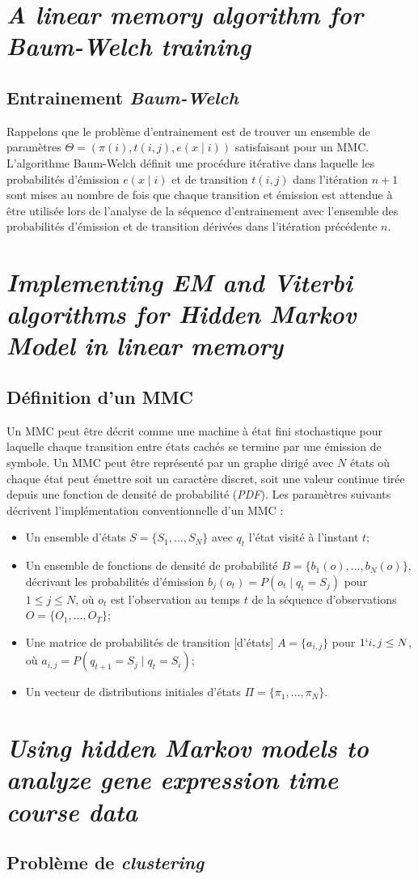 \documentclass[a4paper, 11pt]{article}
\newcommand{\pinit}{\pi (i)}
\newcommand{\ptrans}{t(i,j)}
\newcommand{\pemi}{e(x\mid i)}
\begin{document}
\section{\textit{A linear memory algorithm for Baum-Welch training}}
\subsection{Entrainement \textit{Baum-Welch}}
Rappelons que le problème d'entrainement est de trouver un ensemble de paramètres $\Theta = (\pinit,\ptrans,\pemi)$ satisfaisant pour un MMC.
L'algorithme Baum-Welch définit une procédure itérative dans laquelle les probabilités d'émission $\pemi$ et de transition $\ptrans$ dans l'itération $n+1$ sont mises au nombre de fois que chaque transition et émission est attendue à être utilisée lors de l'analyse de la séquence d'entrainement avec l'ensemble des probabilités d'émission et de transition dérivées dans l'itération précédente $n$.

\section{\textit{Implementing EM and Viterbi algorithms for Hidden Markov Model in linear memory}}
\subsection{Définition d'un MMC}
Un MMC peut être décrit comme une machine à état fini stochastique pour laquelle chaque transition entre états cachés se termine par une émission de symbole. Un MMC peut être représenté par un graphe dirigé avec $N$ états où chaque état peut émettre soit un caractère discret, soit une valeur continue tirée depuis une fonction de densité de probabilité (\textit{PDF}). Les paramètres suivants décrivent l'implémentation conventionnelle d'un MMC :
\begin{itemize}
	\item Un ensemble d'états $S=\{S_1,\dotsc ,S_N\}$ avec $q_t$ l'état visité à l'instant $t$;
	\item Un ensemble de fonctions de densité de probabilité $B = \{b_1(o),\dotsc ,b_N(o)\}$, décrivant les probabilités d'émission $b_j(o_t) = P(o_t \mid q_t = S_j)$ pour $1\leq j\leq N$, où $o_t$ est l'observation au temps $t$ de la séquence d'observations $O=\{O_1,\dotsc ,O_T\}$;
	\item Une matrice de probabilités de transition [d'états] $A = \{a_{i, j}\}$ pour $1\lq i, j \leq N$, où $a_{i, j}=P(q_{t+1} = S_j \mid q_t = S_i)$;
	\item Un vecteur de distributions initiales d'états $\Pi = \{\pi_1,\dotsc ,\pi_N\}$.
\end{itemize}

\section{\textit{Using hidden Markov models to analyze gene expression time course data}}
\subsection{Problème de \textit{clustering}}
\end{document}
